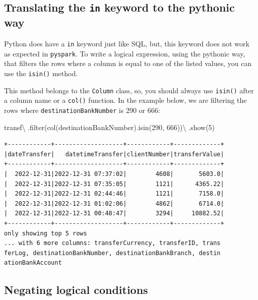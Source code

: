 \documentclass[
  11pt,
  letterpaper,
  DIV=11,
  numbers=noendperiod]{scrreprt}
\newenvironment{Shaded}{\begin{snugshade}}{\end{snugshade}}
\newcommand{\BuiltInTok}[1]{\textcolor[rgb]{0.00,0.23,0.31}{#1}}
\newcommand{\DecValTok}[1]{\textcolor[rgb]{0.68,0.00,0.00}{#1}}
\newcommand{\NormalTok}[1]{\textcolor[rgb]{0.00,0.23,0.31}{#1}}
\newcommand{\OperatorTok}[1]{\textcolor[rgb]{0.37,0.37,0.37}{#1}}
\newcommand{\StringTok}[1]{\textcolor[rgb]{0.13,0.47,0.30}{#1}}
\begin{document}
\subsection{\texorpdfstring{Translating the \texttt{in} keyword to the
pythonic
way}{Translating the in keyword to the pythonic way}}\label{translating-the-in-keyword-to-the-pythonic-way}

Python does have a \texttt{in} keyword just like SQL, but, this keyword
does not work as expected in \texttt{pyspark}. To write a logical
expression, using the pythonic way, that filters the rows where a column
is equal to one of the listed values, you can use the \texttt{isin()}
method.

This method belongs to the \texttt{Column} class, so, you should always
use \texttt{isin()} after a column name or a \texttt{col()} function. In
the example below, we are filtering the rows where
\texttt{destinationBankNumber} is 290 or 666:

\begin{Shaded}
\begin{Highlighting}[]
\NormalTok{transf}\OperatorTok{\textbackslash{}}
\NormalTok{  .}\BuiltInTok{filter}\NormalTok{(col(}\StringTok{\textquotesingle{}destinationBankNumber\textquotesingle{}}\NormalTok{).isin(}\DecValTok{290}\NormalTok{, }\DecValTok{666}\NormalTok{))}\OperatorTok{\textbackslash{}}
\NormalTok{  .show(}\DecValTok{5}\NormalTok{)}
\end{Highlighting}
\end{Shaded}

\begin{verbatim}
+------------+-------------------+------------+-------------+
|dateTransfer|   datetimeTransfer|clientNumber|transferValue|
+------------+-------------------+------------+-------------+
|  2022-12-31|2022-12-31 07:37:02|        4608|       5603.0|
|  2022-12-31|2022-12-31 07:35:05|        1121|      4365.22|
|  2022-12-31|2022-12-31 02:44:46|        1121|       7158.0|
|  2022-12-31|2022-12-31 01:02:06|        4862|       6714.0|
|  2022-12-31|2022-12-31 00:48:47|        3294|     10882.52|
+------------+-------------------+------------+-------------+
only showing top 5 rows
... with 6 more columns: transferCurrency, transferID, trans
ferLog, destinationBankNumber, destinationBankBranch, destin
ationBankAccount
\end{verbatim}

\subsection{Negating logical
conditions}\label{negating-logical-conditions}
\end{document}
